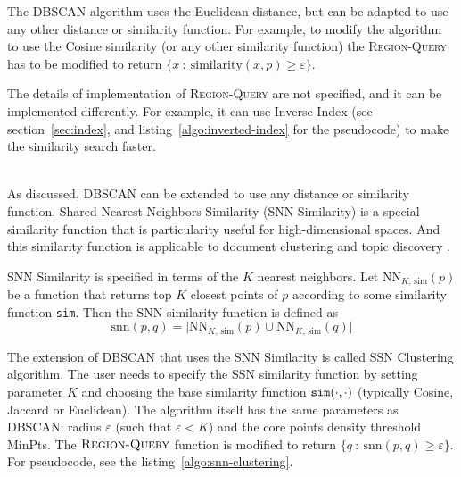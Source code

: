 The DBSCAN algorithm uses the Euclidean distance,
but can be adapted to use any other distance or similarity function.
For example, to modify the algorithm to use the Cosine similarity
(or any other similarity function)
the \textsc{Region-Query} has to be modified to return
$\{ x \ : \ \text{similarity}(x, p) \geqslant \varepsilon \}$.

The details of implementation of \textsc{Region-Query}
are not specified, and it can be implemented differently.
For example, it can use Inverse Index (see section~\ref{sec:index}, and listing~\ref{algo:inverted-index} for the pseudocode)
to make the similarity search faster.


\ \\

As discussed, DBSCAN can be extended to use any distance or similarity function.
Shared Nearest Neighbors Similarity (SNN Similarity) \cite{ertoz2003finding}
is a special similarity function that is particularity useful for
high-dimensional spaces.
And this similarity function is applicable to document clustering
and topic discovery \cite{ertoz2004finding}.

SNN Similarity is specified in terms of the $K$ nearest neighbors.
Let $\text{NN}_{K, \, \text{sim}}(p)$ be a function that returns
top $K$ closest points of $p$ according to some similarity function
\texttt{sim}. Then the SNN similarity function is  defined as
$$\text{snn}(p, q) = \big| \text{NN}_{K, \, \text{sim}}(p) \cup \text{NN}_{K, \, \text{sim}}(q) \big|$$


The extension of DBSCAN that uses the SNN Similarity is called
SSN Clustering algorithm. The user needs to specify the SSN similarity
function by setting parameter $K$ and choosing the base similarity
function $\text{\texttt{sim}}(\cdot, \cdot)$ (typically Cosine, Jaccard
or Euclidean). The algorithm itself has the same
parameters as DBSCAN: radius $\varepsilon$ (such that $\varepsilon < K$)
and the core points density threshold MinPts. The
$\textsc{Region-Query}$ function is modified to return
$\{ q \ : \ \text{snn}(p, q) \geqslant \varepsilon \}$. For pseudocode,
see the listing~\ref{algo:snn-clustering}.

